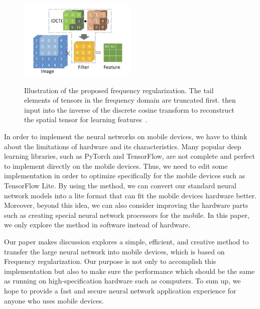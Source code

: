 \documentclass{article}
\begin{document}
\begin{figure}
	\vspace{-15pt}    %
	\includegraphics[width=0.5\textwidth]{figure/idct.png}\\
	\vspace{-15pt}    %
	\caption{Illustration of the proposed frequency regularization. The tail elements of tensors in the frequency domain are truncated first. then input into the inverse of the discrete cosine transform to reconstruct the spatial tensor for learning features~\cite{zhao2023frequency}.}
	\label{idct}
	\vspace{-15pt}    %
\end{figure}


In order to implement the neural networks on mobile devices, we have to think about the limitations of hardware and its characteristics. Many popular deep learning libraries, such as PyTorch and TensorFlow, are not complete and perfect to implement directly on the mobile devices. Thus, we need to edit some implementation in order to optimize specifically for the mobile devices such as TensorFlow Lite. By using the method, we can convert our standard neural network models into a lite format that can fit the mobile devices hardware better. Moreover, beyond this idea, we can also consider improving the hardware parts such as creating special neural network processors for the mobile. In this paper, we only explore the method in software instead of hardware.

Our paper makes discussion explores a simple, efficient, and creative method to transfer the large neural network into mobile devices, which is based on Frequency regularization. Our purpose is not only to accomplish this implementation but also to make sure the performance which should be the same as running on high-specification hardware such as computers. To sum up, we hope to provide a fast and secure neural network application experience for anyone who uses mobile devices.


\end{document}
